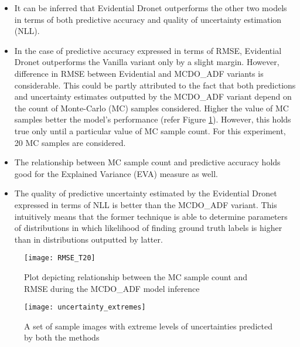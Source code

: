 \begin{itemize}
	\item It can be inferred that Evidential Dronet outperforms the other two models in terms of both predictive accuracy and quality of uncertainty estimation (NLL).
	\item In the case of predictive accuracy expressed in terms of RMSE, Evidential Dronet outperforms the Vanilla variant only by a slight margin. However, difference in RMSE between Evidential and MCDO\_ADF variants is considerable. This could be partly attributed to the fact that both predictions and uncertainty estimates outputted by the MCDO\_ADF variant depend on the count of Monte-Carlo (MC) samples considered. Higher the value of MC samples better the model's performance (refer Figure \ref{fig_mc_count_vs_rmse}).  However, this holds true only until a particular value of MC sample count. For this experiment, 20 MC samples are considered. 
	\item The relationship between MC sample count and predictive accuracy holds good for the Explained Variance (EVA) measure as well.
	\item The quality of predictive uncertainty estimated by the Evidential Dronet expressed in terms of NLL is better than the MCDO\_ADF variant. This intuitively means that the former technique is able to determine parameters of distributions in which likelihood of finding ground truth labels is higher than in  distributions outputted by latter.
\end{itemize}
\begin{figure}[H]
	\centering
	\texttt{[image: RMSE\_T20]}
	\caption{Plot depicting relationship between the MC sample count and RMSE during the MCDO\_ADF model inference}
	\label{fig_mc_count_vs_rmse}
\end{figure}
\begin{figure}[H]
	\centering
	\texttt{[image: uncertainty\_extremes]}
	\caption{A set of sample images with extreme levels of uncertainties predicted by both the methods}
	\label{fig_uncertainty_extremes}
\end{figure}
